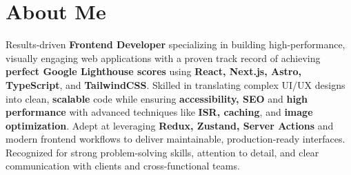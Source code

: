 \section{About Me}
    \begin{onecolentry}
        Results-driven \textbf{Frontend Developer} specializing in building high-performance, visually engaging web applications with a proven track record of achieving \textbf{perfect Google Lighthouse scores} using \textbf{React, Next.js, Astro, TypeScript}, and \textbf{TailwindCSS}. Skilled in translating complex UI/UX designs into clean, \textbf{scalable} code while ensuring \textbf{accessibility, SEO} and \textbf{high performance} with advanced techniques like \textbf{ISR, caching}, and \textbf{image optimization}. Adept at leveraging \textbf{Redux, Zustand, Server Actions} and modern frontend workflows to deliver maintainable, production-ready interfaces. Recognized for strong problem-solving skills, attention to detail, and clear communication with clients and cross-functional teams.
    \end{onecolentry}

